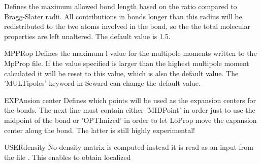 \begin{keywordlist}
Defines the maximum allowed bond length based on the ratio compared to
Bragg-Slater radii. All contributions in bonds longer than this radius will
be redistributed to the two atoms involved in the bond, so the the total
molecular properties are left unaltered. The default value is 1.5.
\item[MPPRop]
Defines the maximum l value for the multipole moments written to the MpProp
file. If the value specified is larger than the highest multipole moment
calculated it will be reset to this value, which is also the default value.
The 'MULTipoles' keyword in Seward can change the default value.
\item[EXPAnsion center]
Defines which points will be used as the expansion centers for the bonds. The
next line must contain either 'MIDPoint' in order just to use the midpoint of
the bond or 'OPTImized' in order to let LoProp move the expansion center along
the bond. The latter is still highly experimental!
\item[USERdensity]
No density matrix is computed instead it is read as an input from the file
. This enables  to obtain localized

\end{keywordlist}

